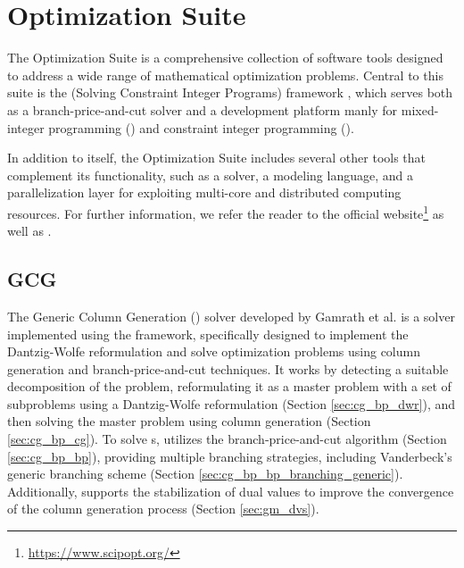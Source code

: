\chapter{\SCIP{} Optimization Suite}\label{ch:tools}
The \SCIP{} Optimization Suite is a comprehensive collection of software tools designed to address a wide range of mathematical optimization problems. Central to this suite is the \SCIP{} (Solving Constraint Integer Programs) framework \cite{achterberg2007constraint, achterberg2009scip}, which serves both as a branch-price-and-cut solver and a development platform manly for mixed-integer programming (\MIP{}) and constraint integer programming (\CIP{}).

In addition to \SCIP{} itself, the \SCIP{} Optimization Suite includes several other tools that complement its functionality, such as a \LP{} solver, a modeling language, and a parallelization layer for exploiting multi-core and distributed computing resources. For further information, we refer the reader to the official \SCIP{} website\footnote{\url{https://www.scipopt.org/}} as well as \cite{bolusani2024scip}.

\section{GCG}\label{sec:tools_gcg}
The Generic Column Generation (\GCG{}) solver developed by Gamrath et al. \cite{gamrath2010generic} is a solver implemented using the \SCIP{} framework, specifically designed to implement the Dantzig-Wolfe reformulation and solve optimization problems using column generation and branch-price-and-cut techniques. It works by detecting a suitable decomposition of the problem, reformulating it as a master problem with a set of subproblems using a Dantzig-Wolfe reformulation (Section \ref{sec:cg_bp_dwr}), and then solving the master problem using column generation (Section \ref{sec:cg_bp_cg}). To solve \MIP{}s, \GCG{} utilizes the branch-price-and-cut algorithm (Section \ref{sec:cg_bp_bp}), providing multiple branching strategies, including Vanderbeck's generic branching scheme (Section \ref{sec:cg_bp_bp_branching_generic}). Additionally, \GCG{} supports the stabilization of dual values to improve the convergence of the column generation process (Section \ref{sec:gm_dvs}).
